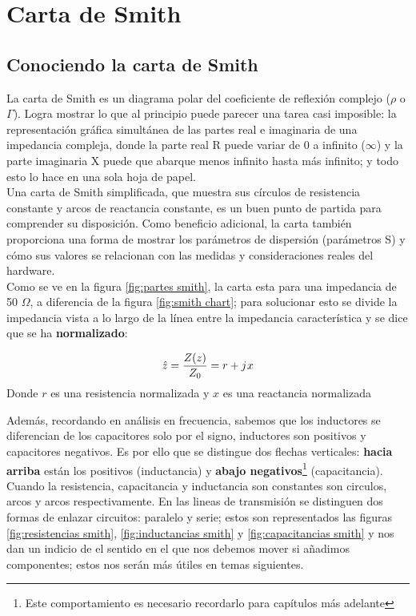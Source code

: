 \documentclass[
	12pt, %
	fleqn, %
	a4paper, %
	oneside, %
]{LegrandOrangeBook}
\begin{document}
\chapter{Carta de Smith}
\section{Conociendo la carta de Smith}
La carta de Smith es un diagrama polar del coeficiente de reflexión complejo ($\rho$ o $\Gamma$). Logra mostrar lo que al principio puede parecer una tarea casi imposible: la representación gráfica simultánea de las partes real e imaginaria de una impedancia compleja, donde la parte real R puede variar de 0 a infinito ($\infty$) y la parte imaginaria X puede que abarque menos infinito hasta más infinito; y todo esto lo hace en una sola hoja de papel.\\
Una carta de Smith simplificada, que muestra sus círculos de resistencia constante y arcos de reactancia constante, es un buen punto de partida para comprender su disposición. Como beneficio adicional, la carta también proporciona una forma de mostrar los parámetros de dispersión (parámetros S) y cómo sus valores se relacionan con las medidas y consideraciones reales del hardware.\\
Como se ve en la figura \ref{fig:partes smith}, la carta esta para una impedancia de 50 $\Omega$, a diferencia de la figura \ref{fig:smith chart}; para solucionar esto se divide la impedancia vista a lo largo de la línea entre la impedancia característica y se dice que se ha \textbf{normalizado}:
\begin{corollary}
\begin{equation}
\hat{z}=\frac{Z(z)}{Z_0}=r+{j\mkern1mu} x
\label{eq:imp normalizada}
\end{equation}
Donde $r$ es una resistencia normalizada y $x$ es una reactancia normalizada
\end{corollary}
Además, recordando en análisis en frecuencia, sabemos que los inductores se diferencian de los capacitores solo por el signo, inductores son positivos y capacitores negativos. Es por ello que se distingue dos flechas verticales: \textbf{hacia arriba} están los positivos (inductancia) y \textbf{abajo negativos}\footnote{Este comportamiento es necesario recordarlo para capítulos más adelante} (capacitancia). Cuando la resistencia, capacitancia y inductancia son constantes son circulos, arcos y arcos respectivamente. En las lineas de transmisión se distinguen dos formas de enlazar circuitos: paralelo y serie; estos son representados las figuras \ref{fig:resistencias smith}, \ref{fig:inductancias smith} y \ref{fig:capacitancias smith} y nos dan un indicio de el sentido en el que nos debemos mover si añadimos componentes; estos nos serán más útiles en temas siguientes.
\end{document}
